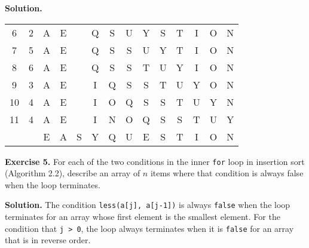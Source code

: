 \documentclass[12pt, a4paper]{article}
\newenvironment{ex}[2][Exercise]
{\par\medskip\noindent \textbf{#1 #2.}}
{\medskip}
\newenvironment{sol}[1][Solution]
{\par\medskip\noindent \textbf{#1.} }
{\medskip}
\begin{document}
\begin{sol}
\begin{center}
\begin{tabular}{cc|cccccccccccc}
				6 & 2 & {\color{gray} A} & {\color{gray}E} & {\color{red}{E}} & {\color{black}Q} & {\color{black}S}
				& {\color{black}U} & {\color{black}Y} & {\color{gray}S} & {\color{gray}T}
				& {\color{gray}I} & {\color{gray}O} & {\color{gray}N} \\
				
				7 & 5 & {\color{gray} A} & {\color{gray}E} & {\color{gray}{E}} & {\color{gray}Q} & {\color{gray}S} & {\color{red}S}
				& {\color{black}U} & {\color{black}Y} & {\color{gray}T}
				& {\color{gray}I} & {\color{gray}O} & {\color{gray}N} \\
				
				8 & 6 & {\color{gray} A} & {\color{gray}E} & {\color{gray}{E}} & {\color{gray}Q} & {\color{gray}S} & {\color{gray}S} & {\color{red}T}
				& {\color{black}U} & {\color{black}Y} 
				& {\color{gray}I} & {\color{gray}O} & {\color{gray}N} \\
				
				9 & 3 & {\color{gray} A} & {\color{gray}E} & {\color{gray}{E}} &  {\color{red}I} &
				{\color{black}Q} & {\color{black}S} & {\color{black}S} & {\color{black}T}
				& {\color{black}U} & {\color{black}Y} 
				& {\color{gray}O} & {\color{gray}N} \\
				
				10 & 4 & {\color{gray} A} & {\color{gray}E} & {\color{gray}{E}} &  {\color{gray}I} &
				{\color{red}O} & {\color{black}Q} & {\color{black}S} & {\color{black}S} & {\color{black}T}
				& {\color{black}U} & {\color{black}Y} 
				& {\color{gray}N} \\
				
				11 & 4 & {\color{gray} A} & {\color{gray}E} & {\color{gray}{E}} &  {\color{gray}I}
				& {\color{red}N} &
				{\color{black}O} & {\color{black}Q} & {\color{black}S} & {\color{black}S} & {\color{black}T}
				& {\color{black}U} & {\color{black}Y}  \\
				
				{} & {} & E & A & S & Y & Q & U & E & S & T & I & O & N \\
			\end{tabular}
		\end{center}
	\end{sol}
	\begin{ex}{5}
		For each of the two conditions in the inner \texttt{for} loop in insertion sort (Algorithm 2.2),
		describe an array of $n$ items where that condition is always false when the loop terminates.
	\end{ex}
	\begin{sol}
		The condition \texttt{less(a[j], a[j-1])} is always \texttt{false} when the loop
		terminates for an array whose first element is the smallest element.
		For the condition that \texttt{j > 0}, the loop always terminates when it is
		\texttt{false} for an array that is in reverse order.
	\end{sol}
\end{document}
